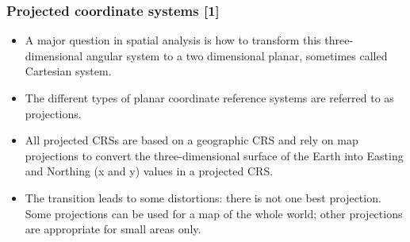 \documentclass[11pt]{beamer}
\begin{document}
\begin{frame}
\frametitle{Projected coordinate systems [1]}
\begin{itemize} \setlength\itemsep{\fill}
\item A major question in spatial analysis is how to transform this three-dimensional angular system to a two dimensional planar, sometimes called \alert{Cartesian} system.
\item The different types of planar coordinate reference systems are referred to as \alert{projections}.
\item All projected CRSs are based on a geographic CRS and rely on map projections to convert the three-dimensional surface of the Earth into Easting and Northing (x and y) values in a projected CRS.
\item The transition leads to some distortions: there is not one best projection. Some projections can be used for a map of the whole world; other projections are appropriate for small areas only.
\end{itemize}
\end{frame}
\end{document}
